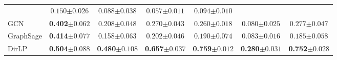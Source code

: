 \documentclass{article}
\newcommand{\firstbest}[1]{\textbf{\textcolor{junscolor1}{#1}}}
\newcommand{\secondbest}[1]{\textbf{\textcolor{junscolor2}{#1}}}
\newcommand{\thirdbest}[1]{\textbf{\textcolor{junscolor3}{#1}}}
\begin{document}
\begin{table}[!t]
\begin{tabular}{l c c c c c c}
&  $0.150{\scriptstyle\pm0.026}$ &  $0.088{\scriptstyle\pm0.038}$ &  $0.057{\scriptstyle\pm0.011}$ &  $0.094{\scriptstyle\pm0.010}$ \\
GCN	& \thirdbest{0.402${\scriptstyle\pm0.062}$} & 0.208${\scriptstyle\pm0.048}$  
&  $0.270{\scriptstyle\pm0.043}$ &  $0.260{\scriptstyle\pm0.018}$ &  $0.080{\scriptstyle\pm0.025}$ &  $0.277{\scriptstyle\pm0.047}$ \\
GraphSage	& \secondbest{0.414${\scriptstyle\pm0.077}$} & 0.158${\scriptstyle\pm0.063}$ 
&  $0.202{\scriptstyle\pm0.046}$ &  $0.190{\scriptstyle\pm0.074}$ &  $0.083{\scriptstyle\pm0.016}$ &  $0.185{\scriptstyle\pm0.058}$ \\
\hline
DirLP	& \firstbest{0.504${\scriptstyle\pm0.088}$} & \firstbest{0.480${\scriptstyle\pm0.108}$} & \firstbest{0.657${\scriptstyle\pm0.037}$} &  \firstbest{0.759${\scriptstyle\pm0.012}$} &  \firstbest{0.280${\scriptstyle\pm0.031}$} &  \firstbest{0.752${\scriptstyle\pm0.028}$} \\
\end{tabular}
\label{t:main_results}
\end{table}
\end{document}
